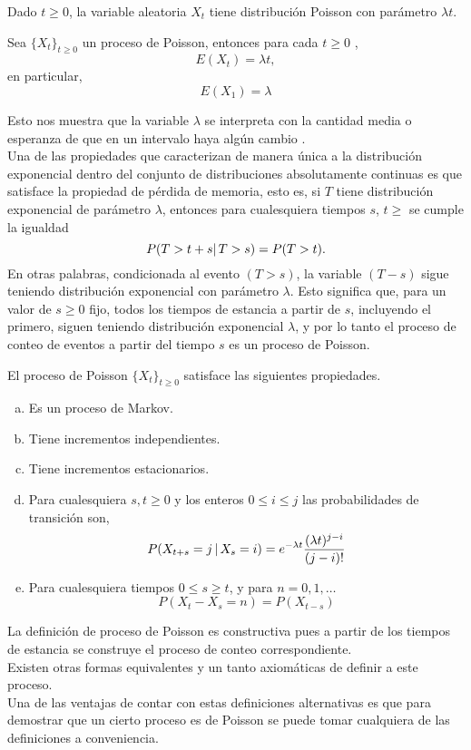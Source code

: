     \begin{Prop}
        Dado $t\geq 0$, la variable aleatoria $X_t$ tiene distribución Poisson con parámetro $\lambda t$.
    \end{Prop}
   \begin{Cor}
   Sea $\{X_t\}_{t\geq 0}$ un proceso de Poisson, entonces para cada $t\geq 0$ , $$E(X_t)=\lambda t,$$ en particular, 
   $$E(X_1)=\lambda$$
   
   \end{Cor}
   Esto nos muestra que la variable $\lambda$ se interpreta con la cantidad media o esperanza de que en un intervalo haya algún cambio .\\
   Una de las propiedades que caracterizan de manera única a la distribución exponencial dentro del conjunto de distribuciones absolutamente continuas es que satisface la propiedad de pérdida de memoria, esto es, si $T$ tiene distribución exponencial de parámetro $\lambda$, entonces para cualesquiera tiempos $s$, $t\geq$ se cumple la igualdad $$P(T>t+s|\thinspace T>s)=P(T>t).$$
    En otras palabras, condicionada al evento $(T>s)$, la variable $(T-s)$ sigue teniendo distribución exponencial con parámetro $\lambda$.
    Esto significa que, para un valor de $s\geq 0$ fijo, todos los tiempos de estancia a partir de $s$, incluyendo el primero, siguen teniendo distribución exponencial $\lambda$, y por lo tanto el proceso de conteo de eventos a partir del tiempo $s$ es un proceso de Poisson.
    \begin{Prop} 
        El proceso de Poisson $\{X_t\}_{t\geq 0}$ satisface las siguientes
        propiedades.
        \label{prop_procPoisson_constructiva}
        \begin{enumerate}[a)]
            \item  Es un proceso de Markov.
            \item Tiene incrementos independientes.
            \item Tiene incrementos estacionarios.
            \item Para cualesquiera $s,t \geq 0$ y los enteros $0\leq i\leq j$ las probabilidades de transición son, $$P(X_{t+s}=j\thinspace|\thinspace X_s=i)= e^{-\lambda t}\frac{(\lambda t)^{j-i}}{(j-i)!}$$
            \item Para cualesquiera tiempos $0\leq s\geq t$, y para $n=0,1,\ldots$
            $$P(X_t-X_s=n)=P(X_{t-s})$$
        \end{enumerate}
    \end{Prop}
    La definición de proceso de Poisson es constructiva pues a partir de los
    tiempos de estancia se construye el proceso de conteo correspondiente.\\
    Existen otras formas equivalentes y un tanto axiomáticas de definir a este
    proceso.\\
    Una de las ventajas de contar con estas definiciones alternativas es que para demostrar que un cierto proceso es de Poisson se puede tomar cualquiera de las definiciones a conveniencia.\\
